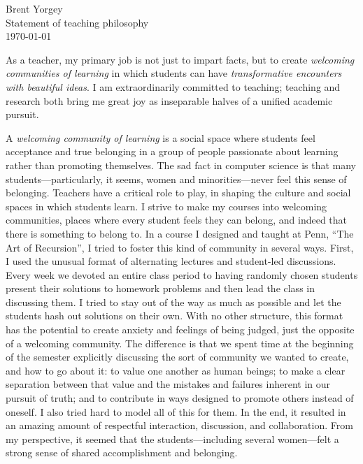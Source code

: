 \documentclass[12pt]{article}
\begin{document}
\noindent Brent Yorgey \\
Statement of teaching philosophy \\
\today
\bigskip

As a teacher, my primary job is not just to impart facts, but to create
\emph{welcoming communities of learning} in which students can have
\emph{transformative encounters with beautiful ideas}.  I am
extraordinarily committed to teaching; teaching and research both
bring me great joy as inseparable halves of a unified academic
pursuit.

A \emph{welcoming community of learning} is a social space where
students feel acceptance and true belonging in a group of people
passionate about learning rather than promoting themselves.  The sad
fact in computer science is that many students---particularly, it
seems, women and minorities---never feel this sense of
belonging. Teachers have a critical role to play, in shaping the
culture and social spaces in which students learn.  I strive to make
my courses into welcoming communities, places where every student
feels they can belong, and indeed that there is something to belong
to.  In a course I designed and taught at Penn, ``The Art of
Recursion'', I tried to foster this kind of community in several ways.
First, I used the unusual format of alternating lectures and
student-led discussions. Every week we devoted an entire class period
to having randomly chosen students present their solutions to homework
problems and then lead the class in discussing them.  I tried to stay
out of the way as much as possible and let the students hash out
solutions on their own.  With no other structure, this format has the
potential to create anxiety and feelings of being judged, just the
opposite of a welcoming community.  The difference is that we spent
time at the beginning of the semester explicitly discussing the sort
of community we wanted to create, and how to go about it: to value one
another as human beings; to make a clear separation between that value
and the mistakes and failures inherent in our pursuit of truth; and to
contribute in ways designed to promote others instead of oneself. I
also tried hard to model all of this for them. In the end, it resulted
in an amazing amount of respectful interaction, discussion, and
collaboration. From my perspective, it seemed that the
students---including several women---felt a strong sense of shared
accomplishment and belonging.

\end{document}
